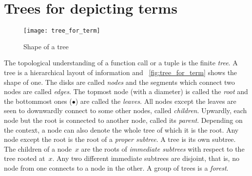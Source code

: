 \section{Trees for depicting terms}
\label{def:tree}

%
\begin{wrapfigure}[9]{r}[0pt]{0pt}
\centering
\texttt{[image: tree\_for\_term]}%
\caption{Shape of a tree\label{fig:tree_for_term}}
\end{wrapfigure}
The topological understanding of a function call or a tuple is the
finite \emph{tree}. A tree is a hierarchical layout of
information and \fig~\vref{fig:tree_for_term} shows the shape of
one. The disks are called \emph{nodes} and the
segments which connect two nodes are called
\emph{edges}. The topmost node (with a diameter) is
called the \emph{root} and the bottommost ones
(\(\bullet\)) are called the \emph{leaves}. All
nodes except the leaves are seen to downwardly connect to some other
nodes, called \emph{children}. Upwardly, each
node but the root is connected to another node, called its
\emph{parent}. Depending on the context, a
node can also denote the whole tree of which it is the root. Any node
except the root is the root of a \emph{proper
  subtree}. A tree is its own
subtree. The children of a node~\(x\) are the roots of \emph{immediate
  subtrees} with respect to the
tree rooted at~\(x\). Any two different immediate subtrees are
disjoint, that is, no node from one connects to a node in the other. A
group of trees is a \emph{forest}.

